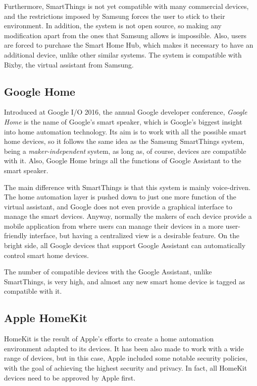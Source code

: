 Furthermore, SmartThings is not yet compatible with many commercial devices, and the restrictions imposed by Samsung forces the
user to stick to their environment. In addition, the system is not open source, so making any modification apart from the ones that
Samsung allows is impossible. Also, users are forced to purchase the Smart Home Hub, which makes it necessary to have an additional
device, unlike other similar systems. The system is compatible with Bixby, the virtual assistant from Samsung.

\subsection{Google Home}
Introduced at Google I/O 2016, the annual Google developer conference, \textit{Google Home} is the name of Google's smart speaker, 
which is Google's biggest insight into home automation technology. Its aim is to work with all the possible smart home devices, so it 
follows the same idea as the Samsung SmartThings system, being a \textit{maker-independent} system, as long as, of course, devices 
are compatible with it. Also, Google Home brings all the functions of Google Assistant to the smart speaker.

The main difference with SmartThings is that this system is mainly voice-driven. The home automation layer is pushed down to just 
one more function of the virtual assistant, and Google does not even provide a graphical interface to manage the smart devices.
Anyway, normally the makers of each device provide a mobile application from where users can manage their devices in a more
user-friendly interface, but having a centralized view is a desirable feature. On the bright side, all Google devices that support
Google Assistant can automatically control smart home devices. 

The number of compatible devices with the Google Assistant, unlike SmartThings, is very high, and almost any new smart home 
device is tagged as compatible with it.

\subsection{Apple HomeKit}
HomeKit is the result of Apple's efforts to create a home automation environment adapted to its devices. It has been also made to work
with a wide range of devices, but in this case, Apple included some notable security policies, with the goal of achieving the highest 
security and privacy. In fact, all HomeKit devices need to be approved by Apple first.

